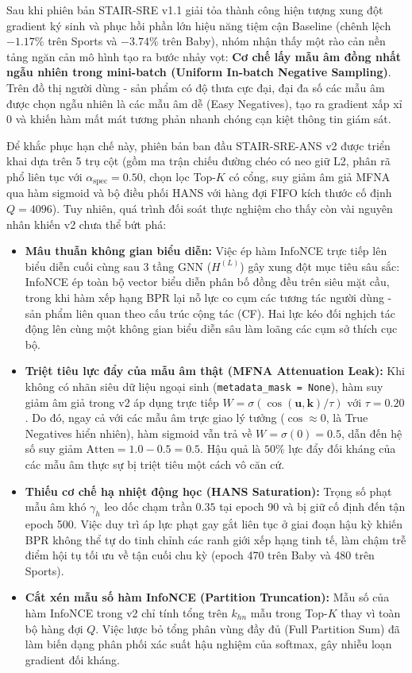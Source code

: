 Sau khi phiên bản STAIR-SRE v1.1 giải tỏa thành công hiện tượng xung đột gradient ký sinh và phục hồi phần lớn hiệu năng tiệm cận Baseline (chênh lệch $-1.17\%$ trên Sports và $-3.74\%$ trên Baby), nhóm nhận thấy một rào cản nền tảng ngăn cản mô hình tạo ra bước nhảy vọt: \textbf{Cơ chế lấy mẫu âm đồng nhất ngẫu nhiên trong mini-batch (Uniform In-batch Negative Sampling)}. Trên đồ thị người dùng - sản phẩm có độ thưa cực đại, đại đa số các mẫu âm được chọn ngẫu nhiên là các mẫu âm dễ (Easy Negatives), tạo ra gradient xấp xỉ 0 và khiến hàm mất mát tương phản nhanh chóng cạn kiệt thông tin giám sát.

Để khắc phục hạn chế này, phiên bản ban đầu STAIR-SRE-ANS v2 được triển khai dựa trên 5 trụ cột (gồm ma trận chiếu đường chéo có neo giữ L2, phân rã phổ liên tục với $\alpha_{\text{spec}} = 0.50$, chọn lọc Top-$K$ có cổng, suy giảm âm giả MFNA qua hàm sigmoid và bộ điều phối HANS với hàng đợi FIFO kích thước cố định $Q=4096$). Tuy nhiên, quá trình đối soát thực nghiệm cho thấy còn vài nguyên nhân khiến v2 chưa thể bứt phá:

\begin{itemize}[leftmargin=*]
    \item \textbf{Mâu thuẫn không gian biểu diễn:} Việc ép hàm InfoNCE trực tiếp lên biểu diễn cuối cùng sau 3 tầng GNN ($H^{(L)}$) gây xung đột mục tiêu sâu sắc: InfoNCE ép toàn bộ vector biểu diễn phân bố đồng đều trên siêu mặt cầu, trong khi hàm xếp hạng BPR lại nỗ lực co cụm các tương tác người dùng - sản phẩm liên quan theo cấu trúc cộng tác (CF). Hai lực kéo đối nghịch tác động lên cùng một không gian biểu diễn sâu làm loãng các cụm sở thích cục bộ.
    \item \textbf{Triệt tiêu lực đẩy của mẫu âm thật (MFNA Attenuation Leak):} Khi không có nhãn siêu dữ liệu ngoại sinh (\texttt{metadata\_mask = None}), hàm suy giảm âm giả trong v2 áp dụng trực tiếp $W = \sigma(\cos(\mathbf{u}, \mathbf{k}) / \tau)$ với $\tau = 0.20$. Do đó, ngay cả với các mẫu âm trực giao lý tưởng ($\cos \approx 0$, là True Negatives hiển nhiên), hàm sigmoid vẫn trả về $W = \sigma(0) = 0.5$, dẫn đến hệ số suy giảm $\text{Atten} = 1.0 - 0.5 = 0.5$. Hậu quả là $50\%$ lực đẩy đối kháng của các mẫu âm thực sự bị triệt tiêu một cách vô căn cứ.
    \item \textbf{Thiếu cơ chế hạ nhiệt động học (HANS Saturation):} Trọng số phạt mẫu âm khó $\gamma_h$ leo dốc chạm trần $0.35$ tại epoch 90 và bị giữ cố định đến tận epoch 500. Việc duy trì áp lực phạt gay gắt liên tục ở giai đoạn hậu kỳ khiến BPR không thể tự do tinh chỉnh các ranh giới xếp hạng tinh tế, làm chậm trễ điểm hội tụ tối ưu về tận cuối chu kỳ (epoch 470 trên Baby và 480 trên Sports).
    \item \textbf{Cắt xén mẫu số hàm InfoNCE (Partition Truncation):} Mẫu số của hàm InfoNCE trong v2 chỉ tính tổng trên $k_{hn}$ mẫu trong Top-$K$ thay vì toàn bộ hàng đợi $Q$. Việc lược bỏ tổng phân vùng đầy đủ (Full Partition Sum) đã làm biến dạng phân phối xác suất hậu nghiệm của softmax, gây nhiễu loạn gradient đối kháng.
\end{itemize}

